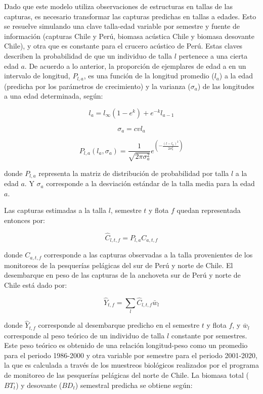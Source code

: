 \documentclass[letter,11pt]{article}
\begin{document}
Dado que este modelo utiliza observaciones de estructuras en tallas de
las capturas, es necesario transformar las capturas predichas en tallas
a edades. Esto se resuelve simulando una clave talla-edad variable por
semestre y fuente de informaci\'on (capturas Chile y Per\'u, biomasa
ac\'ustica Chile y biomasa desovante Chile), y otra que es constante para
el crucero ac\'ustico de Per\'u. Estas claves describen la probabilidad de
que un individuo de talla $l$ pertenece a una cierta edad $a$. De
acuerdo a lo anterior, la proporci\'on de ejemplares de edad a en un
intervalo de longitud, $P_{l,a}$, es una funci\'on de la longitud
promedio ($l_a$) a la edad (predicha por los par\'ametros de
crecimiento) y la varianza ($\sigma_a$) de las longitudes a una edad
determinada, seg\'un:

\begin{equation}
l_a=l_\infty\left(1-e^k\right)+e^{-k}l_{a-1}
\end{equation}

\begin{equation}
\sigma_a=cvl_a
\end{equation}

\begin{equation}
P_{l,a}(l_a,\sigma_a)=\frac{1}{\sqrt{2 \pi\sigma^2_a}}e^{\left(-\frac{(l-l_a)^2}{2\sigma^2_a}\right)}
\end{equation}

donde $P_{l,a}$ representa la matriz de distribuci\'on de probabilidad
por talla $l$ a la edad $a$. Y $\sigma_a$ corresponde a la
desviaci\'on est\'andar de la talla media para la edad $a$.

Las capturas estimadas a la talla $l$, semestre $t$ y flota $f$
quedan representada entonces por:

\begin{equation}
\hat{C}_{l,t,f}=P_{l,a}C_{a,t,f}
\end{equation}

donde $C_{a,t,f}$ corresponde a las capturas observadas a la talla
provenientes de los monitoreos de la pesquer\'ias pel\'agicas del sur de
Per\'u y norte de Chile. El desembarque en peso de las capturas de la
anchoveta sur de Per\'u y norte de Chile est\'a dado por:

\begin{equation}
\hat{Y}_{t,f}=\sum_{l}\hat{C}_{l,t,f}\bar{w}_l
\end{equation}

donde $\hat{Y}_{t,f}$ corresponde al desembarque predicho en el
semestre $t$ y flota $f$, y $\bar{w}_l$ corresponde al peso
te\'orico de un individuo de talla $l$ constante por semestres. Este
peso te\'orico es obtenido de una relaci\'on longitud-peso como un promedio
para el periodo 1986-2000 y otra variable por semestre para el periodo
2001-2020, la que es calculada a trav\'es de los muestreos biol\'ogicos
realizados por el programa de monitoreo de las pesquer\'ias pel\'agicas del
norte de Chile. La biomasa total ($BT_t$) y desovante ($BD_t$)
semestral predicha se obtiene seg\'un:
\end{document}
